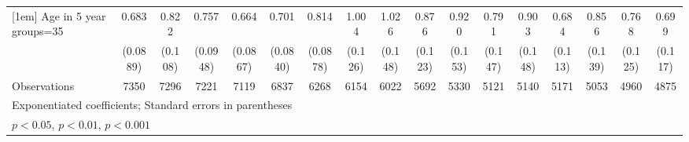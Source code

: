{\begin{tabular}{l*{16}{c}}
[1em]
Age in 5 year groups=35&       0.683\sym{**} &       0.822         &       0.757\sym{*}  &       0.664\sym{**} &       0.701\sym{**} &       0.814         &       1.004         &       1.026         &       0.876         &       0.920         &       0.791         &       0.903         &       0.684\sym{*}  &       0.856         &       0.768         &       0.699\sym{*}  \\
                    &    (0.0889)         &     (0.108)         &    (0.0948)         &    (0.0867)         &    (0.0840)         &    (0.0878)         &     (0.126)         &     (0.148)         &     (0.123)         &     (0.153)         &     (0.147)         &     (0.148)         &     (0.113)         &     (0.139)         &     (0.125)         &     (0.117)         \\
\hline
Observations        &        7350         &        7296         &        7221         &        7119         &        6837         &        6268         &        6154         &        6022         &        5692         &        5330         &        5121         &        5140         &        5171         &        5053         &        4960         &        4875         \\
\hline\hline
\multicolumn{17}{l}{\footnotesize Exponentiated coefficients; Standard errors in parentheses}\\
\multicolumn{17}{l}{\footnotesize \sym{*} \(p<0.05\), \sym{**} \(p<0.01\), \sym{***} \(p<0.001\)}\\
\end{tabular}
}
